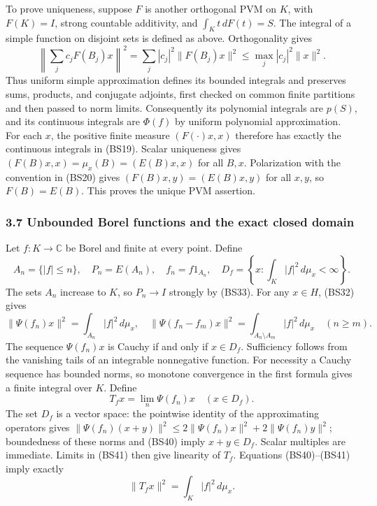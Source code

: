 \documentclass[
  11pt,
]{article}
\begin{document}
To prove uniqueness, suppose \(F\) is another orthogonal PVM on \(K\),
with \(F(K)=I\), strong countable additivity, and \(\int_Kt\,dF(t)=S\).
The integral of a simple function on disjoint sets is defined as above.
Orthogonality gives \[
 \left\|\sum_jc_jF(B_j)x\right\|^2
 =\sum_j|c_j|^2\|F(B_j)x\|^2
 \leq\max_j|c_j|^2\|x\|^2.
\] Thus uniform simple approximation defines its bounded integrals and
preserves sums, products, and conjugate adjoints, first checked on
common finite partitions and then passed to norm limits. Consequently
its polynomial integrals are \(p(S)\), and its continuous integrals are
\(\Phi(f)\) by uniform polynomial approximation. For each \(x\), the
positive finite measure \((F(\cdot)x,x)\) therefore has exactly the
continuous integrals in (BS19). Scalar uniqueness gives
\((F(B)x,x)=\mu_x(B)=(E(B)x,x)\) for all \(B,x\). Polarization with the
convention in (BS20) gives \((F(B)x,y)=(E(B)x,y)\) for all \(x,y\), so
\(F(B)=E(B)\). This proves the unique PVM assertion.

\subsubsection{3.7 Unbounded Borel functions and the exact closed
domain}\label{unbounded-borel-functions-and-the-exact-closed-domain}

Let \(f:K\to\mathbb C\) be Borel and finite at every point. Define \[
 A_n=\{|f|\leq n\},\quad P_n=E(A_n),\quad
 f_n=f1_{A_n},\quad
 D_f=\left\{x:\int_K|f|^2\,d\mu_x<\infty\right\}.
 \tag{BS39}
\] The sets \(A_n\) increase to \(K\), so \(P_n\to I\) strongly by
(BS33). For any \(x\in H\), (BS32) gives \[
 \|\Psi(f_n)x\|^2=\int_{A_n}|f|^2\,d\mu_x,
 \quad
 \|\Psi(f_n-f_m)x\|^2
 =\int_{A_n\setminus A_m}|f|^2\,d\mu_x\quad(n\geq m).
 \tag{BS40}
\] The sequence \(\Psi(f_n)x\) is Cauchy if and only if \(x\in D_f\).
Sufficiency follows from the vanishing tails of an integrable
nonnegative function. For necessity a Cauchy sequence has bounded norms,
so monotone convergence in the first formula gives a finite integral
over \(K\). Define \[
 T_fx=\lim_n\Psi(f_n)x\quad(x\in D_f).
 \tag{BS41}
\] The set \(D_f\) is a vector space: the pointwise identity of the
approximating operators gives
\(\|\Psi(f_n)(x+y)\|^2\leq2\|\Psi(f_n)x\|^2+2\|\Psi(f_n)y\|^2\);
boundedness of these norms and (BS40) imply \(x+y\in D_f\). Scalar
multiples are immediate. Limits in (BS41) then give linearity of
\(T_f\). Equations (BS40)--(BS41) imply exactly \[
 \|T_fx\|^2=\int_K|f|^2\,d\mu_x.
 \tag{BS42}
\]
\end{document}
